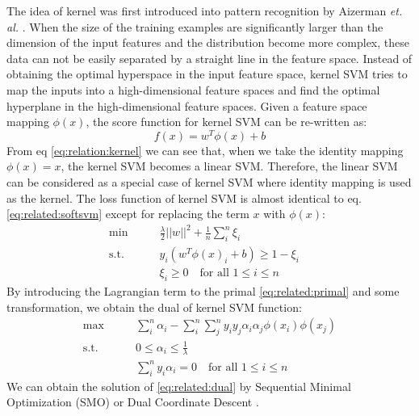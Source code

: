 The idea of kernel was first introduced into pattern recognition by Aizerman \textit{et. al.} \cite{aizerman1964probability}. When the size of the training examples are significantly larger than the dimension of the input features and the distribution become more complex, these data can not be easily separated by a straight line in the feature space.
Instead of obtaining the optimal hyperspace in the input feature space, kernel SVM tries to map the inputs into a high-dimensional feature spaces and find the optimal hyperplane in the high-dimensional feature spaces. Given a feature space mapping $\phi(x)$, the score function for kernel SVM can be re-written as:
\begin{equation}\label{eq:relation:kernel}
	f(x) = w^T\phi(x)+b
\end{equation}
From eq \eqref{eq:relation:kernel} we can see that, when we take the identity mapping $\phi(x) = x$, the kernel SVM becomes a linear SVM. Therefore, the linear SVM can be considered as a special case of kernel SVM where identity mapping is used as the kernel. The loss function of kernel SVM is almost identical to eq. \eqref{eq:related:softsvm} except for replacing the term $x$ with $\phi(x)$: 
\begin{equation}\label{eq:related:primal}
\begin{aligned}
\min \qquad &  \frac{\lambda}{2}||w||^2+\frac{1}{n}\sum_{i}^{n}\xi_i\\
\text{s.t.}\qquad & y_i(w^T\phi(x)_i+b) \geq 1-\xi_i \quad \\
& \xi_i \geq 0 	\quad \text{for all } 1\leq i \leq n
\end{aligned}
\end{equation}
By introducing the Lagrangian term to the primal \eqref{eq:related:primal} and some transformation, we obtain the dual of kernel SVM function:
\begin{equation} \label{eq:related:dual}
	\begin{aligned}
	\max \qquad& \sum_{i}^{n}\alpha_i-\sum\limits_i^n {\sum\limits_j^n {{y_i}{y_j}{\alpha _i}} } {\alpha _j}\phi ({x_i})\phi ({x_j})\\
	\text{s.t.} \qquad & 0 \leq \alpha_i \leq \frac{1}{\lambda}\\
	& \sum_{i}^{n}y_i\alpha_i=0 \quad \text{for all } 1\leq i \leq n
	\end{aligned}
\end{equation}
We can obtain the solution of \eqref{eq:related:dual} by Sequential Minimal Optimization (SMO) \cite{platt1998sequential} or Dual Coordinate Descent \cite{hsieh2008dual}.

